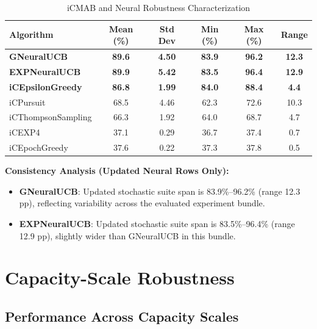 \documentclass[12pt,a4paper]{article}
\newcommand{\success}[1]{\textcolor{accentgreen}{\textbf{#1}}}
\newcommand{\legacy}[1]{\textcolor{legacycolor}{\textbf{#1}}}
\newcommand{\neural}[1]{\textcolor{neuralcolor}{\textbf{#1}}}
\begin{document}
\begin{table}[H]
\centering
\caption{iCMAB and Neural Robustness Characterization}
\label{tab:robustness}
\begin{tabular}{@{}lccccc@{}}
\toprule
\textbf{Algorithm} & \textbf{Mean (\%)} & \textbf{Std Dev} & \textbf{Min (\%)} & \textbf{Max (\%)} & \textbf{Range} \\
\midrule
\neural{GNeuralUCB}        & \neural{89.6} & \neural{4.50} & \neural{83.9} & \neural{96.2} & \neural{12.3} \\
\legacy{EXPNeuralUCB}       & \legacy{89.9} & \legacy{5.42} & \legacy{83.5} & \legacy{96.4} & \legacy{12.9} \\
\success{iCEpsilonGreedy}   & \success{86.8} & \success{1.99} & \success{84.0} & \success{88.4} & \success{4.4} \\
iCPursuit                   & 68.5 & 4.46 & 62.3 & 72.6 & 10.3 \\
iCThompsonSampling          & 66.3 & 1.92 & 64.0 & 68.7 & 4.7 \\
iCEXP4                      & 37.1 & 0.29 & 36.7 & 37.4 & 0.7 \\
iCEpochGreedy               & 37.6 & 0.22 & 37.3 & 37.8 & 0.5 \\
\bottomrule
\end{tabular}
\end{table}

\textbf{Consistency Analysis (Updated Neural Rows Only):}
\begin{itemize}
\item \neural{GNeuralUCB}: Updated stochastic suite span is 83.9\%--96.2\% (range 12.3 pp), reflecting variability across the evaluated experiment bundle.
\item \legacy{EXPNeuralUCB}: Updated stochastic suite span is 83.5\%--96.4\% (range 12.9 pp), slightly wider than GNeuralUCB in this bundle.
\end{itemize}

\section{Capacity-Scale Robustness}

\subsection{Performance Across Capacity Scales}
\end{document}
